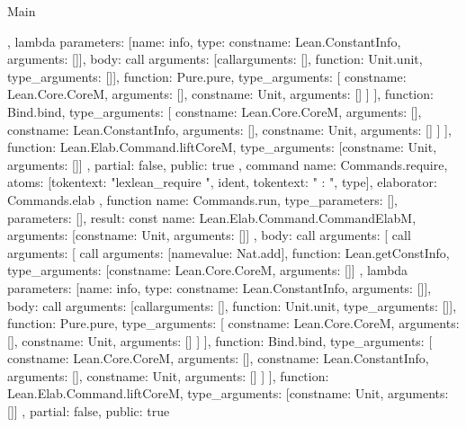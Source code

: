 \begin{lexlean}{Main}
\begin{toolingmodule}
{{{{{{                },
                lambda{
                  parameters: [{name: info, type: const{name: Lean.ConstantInfo, arguments: []}}],
                  body: call{
                    arguments: [call{arguments: [], function: Unit.unit, type_arguments: []}],
                    function: Pure.pure,
                    type_arguments: [
                      const{name: Lean.Core.CoreM, arguments: []},
                      const{name: Unit, arguments: []}
                    ]
                  }
                }
              ],
              function: Bind.bind,
              type_arguments: [
                const{name: Lean.Core.CoreM, arguments: []},
                const{name: Lean.ConstantInfo, arguments: []},
                const{name: Unit, arguments: []}
              ]
            }
          ],
          function: Lean.Elab.Command.liftCoreM,
          type_arguments: [const{name: Unit, arguments: []}]
        }
      },
      partial: false,
      public: true
    },
    command{
      name: Commands.require,
      atoms: [token{text: "lexlean_require "}, ident{}, token{text: " : "}, type{}],
      elaborator: Commands.elab
    },
    function{
      name: Commands.run,
      type_parameters: [],
      parameters: [],
      result: const{
        name: Lean.Elab.Command.CommandElabM,
        arguments: [const{name: Unit, arguments: []}]
      },
      body: call{
        arguments: [
          call{
            arguments: [
              call{
                arguments: [name{value: Nat.add}],
                function: Lean.getConstInfo,
                type_arguments: [const{name: Lean.Core.CoreM, arguments: []}]
              },
              lambda{
                parameters: [{name: info, type: const{name: Lean.ConstantInfo, arguments: []}}],
                body: call{
                  arguments: [call{arguments: [], function: Unit.unit, type_arguments: []}],
                  function: Pure.pure,
                  type_arguments: [
                    const{name: Lean.Core.CoreM, arguments: []},
                    const{name: Unit, arguments: []}
                  ]
                }
              }
            ],
            function: Bind.bind,
            type_arguments: [
              const{name: Lean.Core.CoreM, arguments: []},
              const{name: Lean.ConstantInfo, arguments: []},
              const{name: Unit, arguments: []}
            ]
          }
        ],
        function: Lean.Elab.Command.liftCoreM,
        type_arguments: [const{name: Unit, arguments: []}]
      },
      partial: false,
      public: true
}}
\end{toolingmodule}
\end{lexlean}
